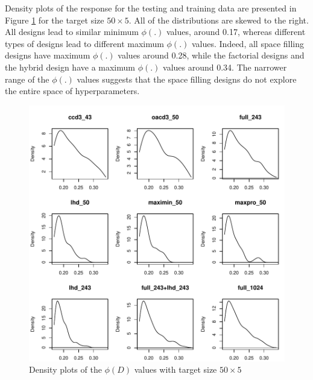 \documentclass [PhD] {package/uclathes}
\begin{document}
Density plots of the response for the testing and training data are presented in Figure \ref{fig:density} for the target size $50\times 5$.  All of the distributions are skewed to the right. All designs lead to similar minimum $\phi(.)$ values, around 0.17, whereas different types of designs lead to different maximum $\phi(.)$ values. Indeed, all space filling designs have  maximum $\phi(.)$ values around 0.28, while the factorial designs and the hybrid design have a maximum $\phi(.)$ values around 0.34. The narrower range of the $\phi(.)$ values suggests that the space filling designs do not explore the entire space of hyperparameters.

\begin{figure}%
    \centering

\includegraphics{chapters/DE/pdfs/density}
  \caption{Density plots of the $\phi(D)$ values with target size $50\times5$}
    \label{fig:density}
\end{figure}
\end{document}
